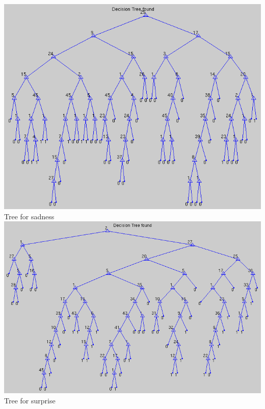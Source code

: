 \documentclass[12pt]{article}
\begin{document}
\begin{center}
  \includegraphics[scale=0.28]{report-images/tree5.png} \\
  Tree for sadness \\
  \vspace{\baselineskip}
  \includegraphics[scale=0.28]{report-images/tree6.png} \\
  Tree for surprise
\end{center}
\end{document}
